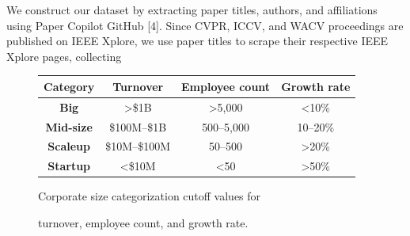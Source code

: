 \documentclass{article}
\begin{document}
We construct our dataset by extracting paper titles, authors, and affiliations using Paper Copilot GitHub [4]. Since CVPR, ICCV, and WACV proceedings are published on IEEE Xplore, we use paper titles to scrape their respective IEEE Xplore pages, collecting 
\begin{figure}
    \noindent
    \hspace{-2mm}
    \begin{minipage}{0.5\textwidth} 
        \centering
        \vspace{-30pt}
        \setlength{\tabcolsep}{3pt} %
        \begin{tabular}{|c|c|c|c|}
            \hline
            \textbf{Category} & \textbf{Turnover} & \textbf{Employee count} & \textbf{Growth rate} \\
            \hline
            \textbf{Big}& >\$1B& >5,000      & <10\% \\
            \textbf{Mid-size} & \$100M–\$1B & 500–5,000 & 10–20\%  \\
            \textbf{Scaleup} &\$10M–\$100M& 50–500 & >20\% \\
            \textbf{Startup} & <\$10M     & <50 & >50\% \\
            \hline
        \end{tabular}
        \begin{minipage}{1.2\textwidth}
            \centering
        \caption{\hspace{1mm}Corporate size categorization cutoff values for}
            \vspace{-7pt}
            \caption*{turnover, employee count, and growth rate.}
            \label{fig:corporate_size}
        \end{minipage}
    \end{minipage}
    \vspace{-24pt}
\end{figure}
\end{document}
